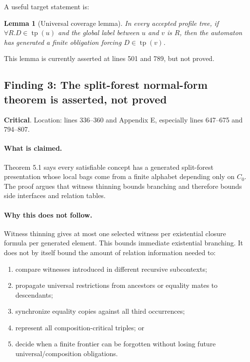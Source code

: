 \documentclass[11pt]{article}
\newcommand{\tp}{\operatorname{tp}}
\newtheorem{lemma}{Lemma}
\newcommand{\Critical}{\textbf{\textcolor{crit}{Critical}}}
\begin{document}
A useful target statement is:

\begin{lemma}[Universal coverage lemma]
In every accepted profile tree, if $\forall R.D\in\tp(u)$ and the global label between $u$ and $v$ is $R$, then the automaton has generated a finite obligation forcing $D\in\tp(v)$.
\end{lemma}

This lemma is currently asserted at lines 501 and 789, but not proved.

\subsection{Finding 3: The split-forest normal-form theorem is asserted, not proved}

\noindent\Critical.  Location: lines 336--360 and Appendix E, especially lines 647--675 and 794--807.

\paragraph{What is claimed.}
Theorem 5.1 says every satisfiable concept has a generated split-forest presentation whose local bags come from a finite alphabet depending only on $C_0$.  The proof argues that witness thinning bounds branching and therefore bounds side interfaces and relation tables.

\paragraph{Why this does not follow.}
Witness thinning gives at most one selected witness per existential closure formula per generated element.  This bounds immediate existential branching.  It does not by itself bound the amount of relation information needed to:
\begin{enumerate}[label=(\alph*)]
\item compare witnesses introduced in different recursive subcontexts;
\item propagate universal restrictions from ancestors or equality mates to descendants;
\item synchronize equality copies against all third occurrences;
\item represent all composition-critical triples; or
\item decide when a finite frontier can be forgotten without losing future universal/composition obligations.
\end{enumerate}
\end{document}
